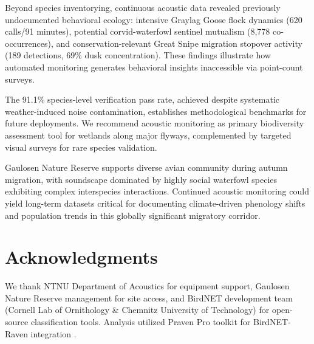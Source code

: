 \documentclass[twocolumn]{article}
\begin{document}
Beyond species inventorying, continuous acoustic data revealed previously undocumented behavioral ecology: intensive Graylag Goose flock dynamics (620 calls/91 minutes), potential corvid-waterfowl sentinel mutualism (8,778 co-occurrences), and conservation-relevant Great Snipe migration stopover activity (189 detections, 69\% dusk concentration). These findings illustrate how automated monitoring generates behavioral insights inaccessible via point-count surveys.

The 91.1\% species-level verification pass rate, achieved despite systematic weather-induced noise contamination, establishes methodological benchmarks for future deployments. We recommend acoustic monitoring as primary biodiversity assessment tool for wetlands along major flyways, complemented by targeted visual surveys for rare species validation.

Gaulosen Nature Reserve supports diverse avian community during autumn migration, with soundscape dominated by highly social waterfowl species exhibiting complex interspecies interactions. Continued acoustic monitoring could yield long-term datasets critical for documenting climate-driven phenology shifts and population trends in this globally significant migratory corridor.

\section*{Acknowledgments}

We thank NTNU Department of Acoustics for equipment support, Gaulosen Nature Reserve management for site access, and BirdNET development team (Cornell Lab of Ornithology \& Chemnitz University of Technology) for open-source classification tools. Analysis utilized Praven Pro toolkit for BirdNET-Raven integration \citep{Redpath2025}.
\end{document}
